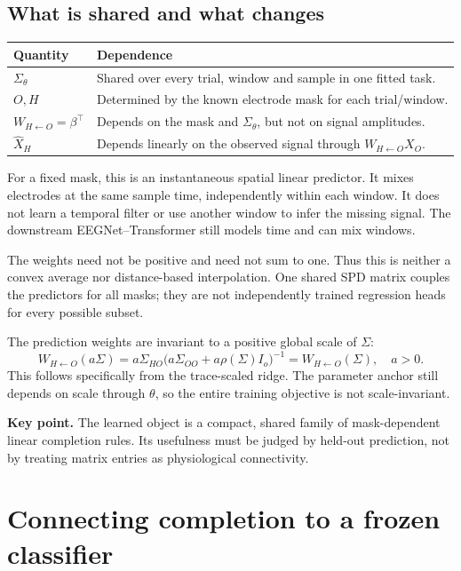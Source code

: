 \documentclass[11pt,a4paper]{article}
\newcommand{\takeaway}[1]{\par\smallskip\noindent\colorbox{pale}{\parbox{\dimexpr\linewidth-2\fboxsep\relax}{\textbf{Key point.} #1}}\par\smallskip}
\begin{document}
\subsection{What is shared and what changes}
\begin{tabularx}{\linewidth}{@{}lY@{}}\toprule
Quantity & Dependence \\ \midrule
$\Sigma_\theta$ & Shared over every trial, window and sample in one fitted task. \\
$O,H$ & Determined by the known electrode mask for each trial/window. \\
$W_{H\leftarrow O}=\beta^\top$ & Depends on the mask and $\Sigma_\theta$, but not on signal amplitudes. \\
$\widehat X_H$ & Depends linearly on the observed signal through $W_{H\leftarrow O}X_O$. \\ \bottomrule
\end{tabularx}

For a fixed mask, this is an instantaneous spatial linear predictor. It mixes
electrodes at the same sample time, independently within each window. It does
not learn a temporal filter or use another window to infer the missing signal.
The downstream EEGNet--Transformer still models time and can mix windows.

The weights need not be positive and need not sum to one. Thus this is neither
a convex average nor distance-based interpolation. One shared SPD matrix
couples the predictors for all masks; they are not independently trained
regression heads for every possible subset.

The prediction weights are invariant to a positive global scale of $\Sigma$:
\begin{equation}
 W_{H\leftarrow O}(a\Sigma)
 =a\Sigma_{HO}\bigl(a\Sigma_{OO}+a\rho(\Sigma)I_o\bigr)^{-1}
 =W_{H\leftarrow O}(\Sigma),\quad a>0.
\end{equation}
This follows specifically from the trace-scaled ridge. The parameter anchor
still depends on scale through $\theta$, so the entire training objective is
not scale-invariant.

\takeaway{The learned object is a compact, shared family of mask-dependent
linear completion rules. Its usefulness must be judged by held-out prediction,
not by treating matrix entries as physiological connectivity.}

\newpage
\section{Connecting completion to a frozen classifier}
\end{document}
